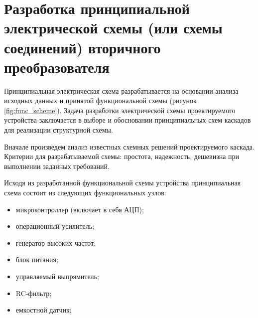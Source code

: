 
\section{Разработка принципиальной электрической схемы (или схемы соединений) вторичного преобразователя}
Принципиальная электрическая схема разрабатывается на основании анализа исходных данных и принятой функциональной схемы (рисунок \ref{fig:func_scheme}). Задача разработки электрической схемы проектируемого устройства заключается в выборе и обосновании принципиальных схем каскадов для реализации структурной схемы.

Вначале произведем анализ известных схемных решений проектируемого каскада. Критерии для разрабатываемой схемы: простота, надежность, дешевизна при выполнении заданных требований.

Исходя из разработанной функциональной схемы устройства принципиальная схема состоит из следующих функциональных узлов:
\begin{itemize}
    \item микроконтроллер (включает в себя АЦП);
    \item операционный усилитель;
    \item генератор высоких частот;
    \item блок питания;
    \item управляемый выпрямитель;
    \item RC-фильтр;
    \item емкостной датчик;
\end{itemize}

\newpage
